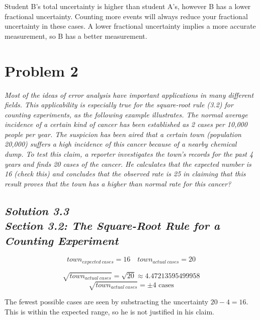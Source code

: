\documentclass[a4paper, 12pt]{article}
\numberwithin{equation}{section}
\begin{document}
Student B's total uncertainty is higher than student A's, however B has a lower fractional uncertainty.
Counting more events will always reduce your fractional uncertainty in these cases.
A lower fractional uncertainty implies a more accurate measurement, so B has a better measurement.

\noindent\makebox[\linewidth]{\rule{\linewidth}{1pt}}
\section{Problem 2}
\emph{Most of the ideas of error analysis have important applications in many
different fields. This applicability is especially true for the square-root rule (3.2)
for counting experiments, as the following example illustrates. The normal average
incidence of a certain kind of cancer has been established as 2 cases per 10,000
people per year. The suspicion has been aired that a certain town (population
20,000) suffers a high incidence of this cancer because of a nearby chemical dump.
To test this claim, a reporter investigates the town's records for the past 4 years and
finds 20 cases of the cancer. He calculates that the expected number is 16 (check
this) and concludes that the observed rate is 25%
in claiming that this result proves that the town has a higher than normal rate for
this cancer?}\\

\subsection*{\emph{Solution 3.3\\Section 3.2: The Square-Root Rule for a Counting Experiment}}

\begin{equation}
  town_{expected\:cases}= 16 \quad town_{actual\:cases} = 20
\end{equation}


\begin{equation}
\sqrt{town_{actual\:cases} } = \sqrt{20} \approx{4.47213595499958}
\end{equation}
\begin{equation}
\sqrt{town_{actual\:cases} } = \pm{4} \text{ cases}
\end{equation}

The fewest possible cases are seen by substracting the uncertainty
$20 - 4 = 16$.
This is within the expected range, so he is not justified in his claim.
\end{document}
